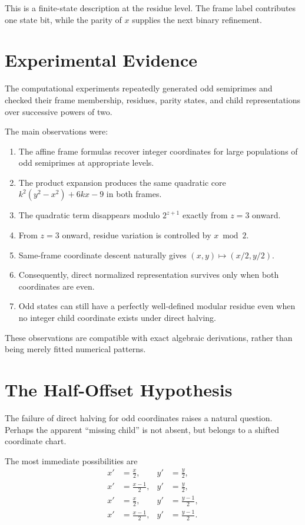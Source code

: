 \documentclass[11pt,a4paper]{article}
\theoremstyle{definition}
\theoremstyle{remark}
\begin{document}
This is a finite-state description at the residue level. The frame label contributes one state bit, while the parity of $x$ supplies the next binary refinement.

\section{Experimental Evidence}

The computational experiments repeatedly generated odd semiprimes and checked their frame membership, residues, parity states, and child representations over successive powers of two.

The main observations were:
\begin{enumerate}
  \item The affine frame formulas recover integer coordinates for large populations of odd semiprimes at appropriate levels.
  \item The product expansion produces the same quadratic core $k^2(y^2-x^2)+6kx-9$ in both frames.
  \item The quadratic term disappears modulo $2^{z+1}$ exactly from $z=3$ onward.
  \item From $z=3$ onward, residue variation is controlled by $x\bmod2$.
  \item Same-frame coordinate descent naturally gives $(x,y)\mapsto(x/2,y/2)$.
  \item Consequently, direct normalized representation survives only when both coordinates are even.
  \item Odd states can still have a perfectly well-defined modular residue even when no integer child coordinate exists under direct halving.
\end{enumerate}

These observations are compatible with exact algebraic derivations, rather than being merely fitted numerical patterns.

\section{The Half-Offset Hypothesis}

The failure of direct halving for odd coordinates raises a natural question. Perhaps the apparent ``missing child'' is not absent, but belongs to a shifted coordinate chart.

The most immediate possibilities are
\begin{align}
 x'&=\frac{x}{2}, & y'&=\frac{y}{2},\\
 x'&=\frac{x-1}{2}, & y'&=\frac{y}{2},\\
 x'&=\frac{x}{2}, & y'&=\frac{y-1}{2},\\
 x'&=\frac{x-1}{2}, & y'&=\frac{y-1}{2}.
\end{align}
\end{document}
